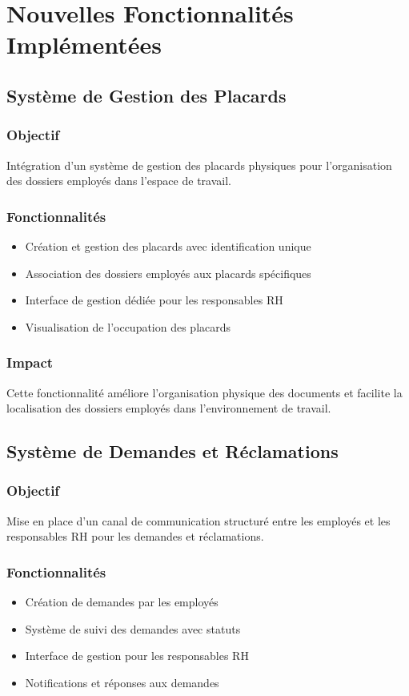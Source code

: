 \documentclass[12pt,a4paper]{article}
\begin{document}
\section{Nouvelles Fonctionnalités Implémentées}

\subsection{Système de Gestion des Placards}

\subsubsection{Objectif}
Intégration d'un système de gestion des placards physiques pour l'organisation des dossiers employés dans l'espace de travail.

\subsubsection{Fonctionnalités}
\begin{itemize}
    \item Création et gestion des placards avec identification unique
    \item Association des dossiers employés aux placards spécifiques
    \item Interface de gestion dédiée pour les responsables RH
    \item Visualisation de l'occupation des placards
\end{itemize}

\subsubsection{Impact}
Cette fonctionnalité améliore l'organisation physique des documents et facilite la localisation des dossiers employés dans l'environnement de travail.

\subsection{Système de Demandes et Réclamations}

\subsubsection{Objectif}
Mise en place d'un canal de communication structuré entre les employés et les responsables RH pour les demandes et réclamations.

\subsubsection{Fonctionnalités}
\begin{itemize}
    \item Création de demandes par les employés
    \item Système de suivi des demandes avec statuts
    \item Interface de gestion pour les responsables RH
    \item Notifications et réponses aux demandes
\end{itemize}
\end{document}
